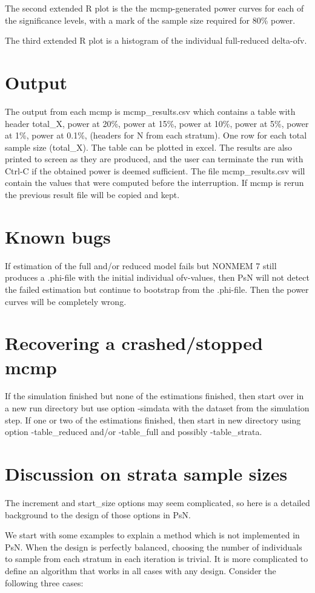 The second extended R plot is the the mcmp-generated power curves for each of the significance levels, with a mark of the sample size required for 80\% power.

The third extended R plot is a histogram of the individual full-reduced delta-ofv. 

\section{Output}
The output from each mcmp is mcmp\_results.csv which contains a table with header total\_X, power at 20\%, power at 15\%, power at 10\%, power at 5\%, power at 1\%, power at 0.1\%, (headers for N from each stratum). 
One row for each total sample size (total\_X). The table can be plotted in excel. The results are also printed to screen as they are produced, and the user can terminate the run with Ctrl-C if the obtained power is deemed sufficient. The file mcmp\_results.csv will contain the values that were computed before the interruption. If mcmp is rerun the previous result file will be copied and kept.

\section{Known bugs}
If estimation of the full and/or reduced model fails but NONMEM 7 still produces a .phi-file with the initial individual ofv-values, then PsN will not detect the failed estimation but continue to bootstrap from the .phi-file. Then the power curves will be completely wrong.

\section{Recovering a crashed/stopped mcmp}
If the simulation finished but none of the estimations finished, then start over in a new run directory but use option -simdata with the dataset from the simulation step. If one or two of the estimations finished, then start in new directory using option -table\_reduced and/or -table\_full and possibly -table\_strata. 

\section{Discussion on strata sample sizes}
The increment and start\_size options may seem complicated, so here is a detailed background to the design of those options in PsN.

We start with some examples to explain a method which is not implemented in PsN. When the design is perfectly balanced, choosing the number of individuals to sample from each stratum in each iteration is trivial. It is more complicated to define an algorithm that works in all cases with any design. Consider the following three cases:

